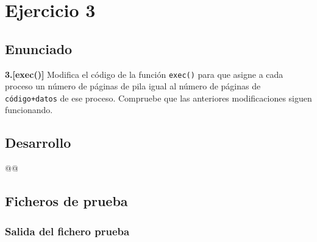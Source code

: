 \section{Ejercicio 3}
\subsection{Enunciado}
\begin{ejer}
    \textbf{3.[exec()]} Modifica el código de la función \texttt{exec()} para que asigne 
    a cada proceso un número de páginas de pila igual al número de páginas de \texttt{código+datos} 
    de ese proceso. Compruebe que las anteriores modificaciones siguen funcionando.
\end{ejer}
\subsection{Desarrollo}
\begin{listing}
@@
\end{listing}
\subsection{Ficheros de prueba}

\subsubsection{Salida del fichero prueba}
\begin{listing}[style=consola]
$:
\end{listing}
